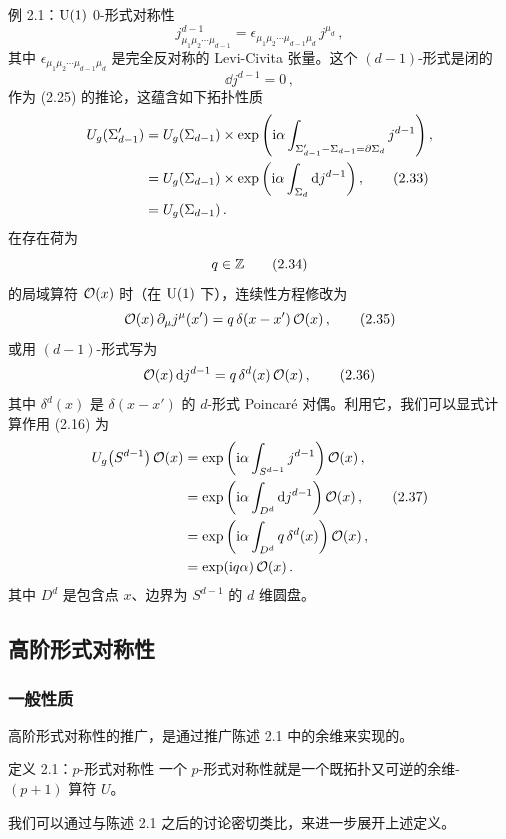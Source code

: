 \begin{examplebox}{例 2.1：$\mathrm{U}(1)$ 0-形式对称性}
\begin{equation}
    j^{d-1}_{\mu_1\mu_2\cdots\mu_{d-1}}=\epsilon_{\mu_1\mu_2\cdots\mu_{d-1}\mu_d}\,j^{\mu_d}\,, \tag{2.31}
\end{equation}
其中 $\epsilon_{\mu_1\mu_2\cdots\mu_{d-1}\mu_d}$ 是完全反对称的 Levi-Civita 张量。这个 $(d-1)$-形式是闭的
\begin{equation}
    \dd j^{d-1}=0\,, \tag{2.32}
\end{equation}
作为 (2.25) 的推论，这蕴含如下拓扑性质
\begin{align}
    U_g(\Sigma'_{d-1}) &= U_g(\Sigma_{d-1})\times\exp\left(\mathrm{i}\alpha\int_{\Sigma'_{d-1}-\Sigma_{d-1}=\partial\Sigma_d}j^{d-1}\right), \notag\\
    &= U_g(\Sigma_{d-1})\times\exp\left(\mathrm{i}\alpha\int_{\Sigma_d}\mathrm{d} j^{d-1}\right), \tag{2.33}\\
    &= U_g(\Sigma_{d-1})\,. \notag
\end{align}
在存在荷为
\begin{equation}
    q\in\mathbb{Z} \tag{2.34}
\end{equation}
的局域算符 $\mathcal{O}(x)$ 时（在 $\mathrm{U}(1)$ 下），连续性方程修改为
\begin{equation}
    \mathcal{O}(x)\,\partial_\mu j^\mu(x')=q\,\delta(x-x')\,\mathcal{O}(x)\,, \tag{2.35}
\end{equation}
或用 $(d-1)$-形式写为
\begin{equation}
    \mathcal{O}(x)\,\mathrm{d} j^{d-1}=q\,\delta^d(x)\,\mathcal{O}(x)\,, \tag{2.36}
\end{equation}
其中 $\delta^d(x)$ 是 $\delta(x-x')$ 的 $d$-形式 Poincar\'e 对偶。利用它，我们可以显式计算作用 (2.16) 为
\begin{align}
    U_g\!\left(S^{d-1}\right)\mathcal{O}(x) &= \exp\left(\mathrm{i}\alpha\int_{S^{d-1}}j^{d-1}\right)\mathcal{O}(x)\,, \notag\\
    &= \exp\left(\mathrm{i}\alpha\int_{D^d}\mathrm{d} j^{d-1}\right)\mathcal{O}(x)\,, \tag{2.37}\\
    &= \exp\left(\mathrm{i}\alpha\int_{D^d}q\,\delta^d(x)\right)\mathcal{O}(x)\,, \notag\\
    &= \exp(\mathrm{i} q\alpha)\,\mathcal{O}(x)\,. \notag
\end{align}
其中 $D^d$ 是包含点 $x$、边界为 $S^{d-1}$ 的 $d$ 维圆盘。
\end{examplebox}

\subsection{高阶形式对称性}

\subsubsection{一般性质}

高阶形式对称性的推广，是通过推广陈述 2.1 中的余维来实现的。

\begin{definitionbox}{定义 2.1：$p$-形式对称性}
一个 $p$-形式对称性就是一个既拓扑又可逆的余维-$(p+1)$ 算符 $U$。
\end{definitionbox}

我们可以通过与陈述 2.1 之后的讨论密切类比，来进一步展开上述定义。
